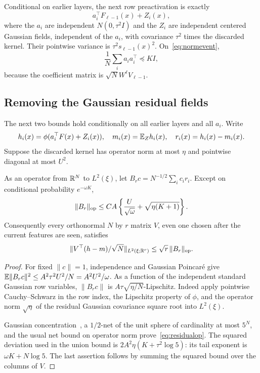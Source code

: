 Conditional on earlier layers, the next row preactivation is exactly
\begin{equation}
 a_i^\top F_{\ell-1}(x)+Z_i(x),
 \label{eq:decomposition}
\end{equation}
where the $a_i$ are independent $N(0,\tau^2I)$ and the $Z_i$ are independent centered Gaussian fields, independent of the $a_i$, with covariance $\tau^2$ times the discarded kernel. Their pointwise variance is $\tau^2s_{\ell-1}(x)^2$.
On~\eqref{eq:normevent},
\[
 \frac1N\sum_i a_ia_i^\top\preceq KI,
\]
because the coefficient matrix is $\sqrt N W^\ell V_{\ell-1}$.

\subsection{Removing the Gaussian residual fields}
The next two bounds hold conditionally on all earlier layers and all $a_i$. Write
\[
 h_i(x)=\phi(a_i^\top F(x)+Z_i(x)),\quad
 m_i(x)=\mathbb E_Zh_i(x),\quad r_i(x)=h_i(x)-m_i(x).
\]
Suppose the discarded kernel has operator norm at most $\eta$ and pointwise diagonal at most $U^2$.

\begin{lemma}
\label{lem:residual}
As an operator from $\mathbb R^N$ to $L^2(\xi)$, let
$B_rc=N^{-1/2}\sum_i c_i r_i$. Except on conditional probability $e^{-\omega K}$,
\begin{equation}
 \|B_r\|_{\mathrm{op}}\le C A\left\{\frac U{\sqrt\omega}
                      +\sqrt{\eta(K+1)}\right\}.
 \label{eq:residualop}
\end{equation}
Consequently every orthonormal $N$ by $r$ matrix $V$, even one chosen after the current features are seen, satisfies
\[
 \|V^\top(h-m)/\sqrt N\|_{L^2(\xi;\mathbb R^r)}
 \le\sqrt r\,\|B_r\|_{\mathrm{op}}.
\]
\end{lemma}
\begin{proof}
For fixed $\|c\|=1$, independence and Gaussian Poincar\'e give
$\mathbb E\|B_rc\|^2\le A^2\tau^2U^2/N=A^2U^2/\omega$.
As a function of the independent standard Gaussian row variables,
$\|B_rc\|$ is $A\tau\sqrt{\eta/N}$-Lipschitz. Indeed apply pointwise Cauchy--Schwarz in the row index, the Lipschitz property of $\phi$, and the operator norm $\sqrt\eta$ of the residual Gaussian covariance square root into $L^2(\xi)$.

Gaussian concentration~\cite{gaussian}, a $1/2$-net of the unit sphere of cardinality at most $5^N$, and the usual net bound on operator norm prove~\eqref{eq:residualop}. The squared deviation used in the union bound is
$2A^2\eta(K+\tau^2\log5)$: its tail exponent is $\omega K+N\log5$.
The last assertion follows by summing the squared bound over the columns of $V$.
\end{proof}

